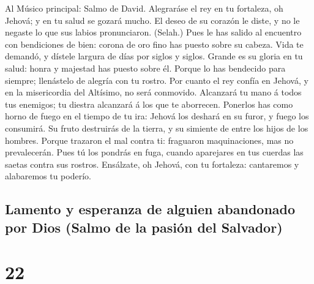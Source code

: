  Al Músico principal: Salmo de David. Alegraráse el rey en
tu fortaleza, oh Jehová; y en tu salud se gozará mucho. 
El deseo de su corazón le diste, y no le negaste lo que sus labios
pronunciaron. (Selah.)  Pues le has salido al encuentro
con bendiciones de bien: corona de oro fino has puesto sobre su cabeza.
 Vida te demandó, y dístele largura de días por siglos y
siglos.  Grande es su gloria en tu salud: honra y majestad
has puesto sobre él.  Porque lo has bendecido para
siempre; llenástelo de alegría con tu rostro.  Por cuanto
el rey confía en Jehová, y en la misericordia del Altísimo, no será
conmovido.  Alcanzará tu mano á todos tus enemigos; tu
diestra alcanzará á los que te aborrecen.  Ponerlos has
como horno de fuego en el tiempo de tu ira: Jehová los deshará en su
furor, y fuego los consumirá.  Su fruto destruirás de la
tierra, y su simiente de entre los hijos de los hombres. 
Porque trazaron el mal contra ti: fraguaron maquinaciones, mas no
prevalecerán.  Pues tú los pondrás en fuga, cuando
aparejares en tus cuerdas las saetas contra sus rostros. 
Ensálzate, oh Jehová, con tu fortaleza: cantaremos y alabaremos tu
poderío.

\hypertarget{lamento-y-esperanza-de-alguien-abandonado-por-dios-salmo-de-la-pasiuxf3n-del-salvador}{%
\subsection{Lamento y esperanza de alguien abandonado por Dios (Salmo de
la pasión del
Salvador)}\label{lamento-y-esperanza-de-alguien-abandonado-por-dios-salmo-de-la-pasiuxf3n-del-salvador}}

\hypertarget{section-21}{%
\section{22}\label{section-21}}

